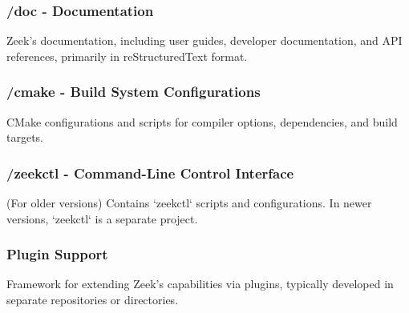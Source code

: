 \subsubsection{/doc - Documentation}
Zeek's documentation, including user guides, developer documentation, and API references, primarily in reStructuredText format.

\subsubsection{/cmake - Build System Configurations}
CMake configurations and scripts for compiler options, dependencies, and build targets.

\subsubsection{/zeekctl - Command-Line Control Interface}
(For older versions) Contains `zeekctl` scripts and configurations. In newer versions, `zeekctl` is a separate project.

\subsubsection{Plugin Support}
Framework for extending Zeek's capabilities via plugins, typically developed in separate repositories or directories.
